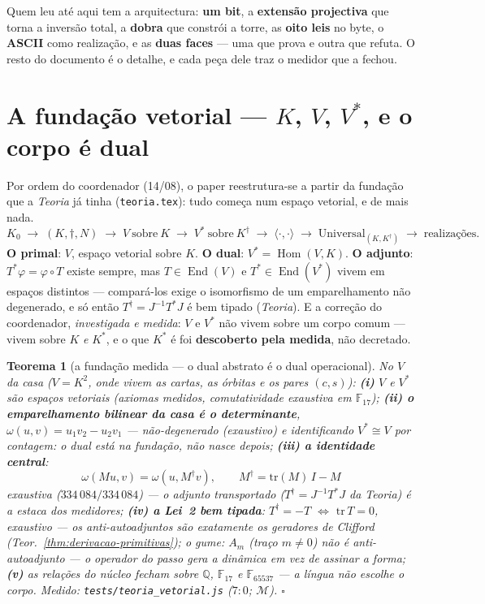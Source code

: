 \documentclass[11pt,a4paper]{article}
\newtheorem{teorema}{Teorema}
\newcommand{\code}[1]{\texttt{\small #1}}
\begin{document}
\medskip
\noindent Quem leu até aqui tem a arquitectura: \textbf{um bit}, a
\textbf{extensão projectiva} que torna a inversão total, a \textbf{dobra}
que constrói a torre, as \textbf{oito leis} no byte, o \textbf{ASCII}
como realização, e as \textbf{duas faces} --- uma que prova e outra que
refuta. O resto do documento é o detalhe, e cada peça dele traz o
medidor que a fechou.

\section{A fundação vetorial --- $K$, $V$, $V^{*}$, e o corpo é
dual}\label{sec:fundacao}

Por ordem do coordenador (14/08), o paper reestrutura-se a partir da
fundação que a \emph{Teoria} já tinha (\code{teoria.tex}): tudo começa
num espaço vetorial, e de mais nada.
\[
\boxed{
K_{0}
\;\longrightarrow\;
(K,\dagger,N)
\;\longrightarrow\;
V\ \text{sobre}\ K
\;\longrightarrow\;
V^{*}\ \text{sobre}\ K^{\dagger}
\;\longrightarrow\;
\langle\cdot,\cdot\rangle
\;\longrightarrow\;
\mathrm{Universal}_{(K,K^{\dagger})}
\;\longrightarrow\;
\text{realizações}.
}
\]
\textbf{O primal}: $V$, espaço vetorial sobre $K$. \textbf{O dual}:
$V^{*}=\operatorname{Hom}(V,K)$. \textbf{O adjunto}:
$T^{*}\varphi=\varphi\circ T$ existe sempre, mas
$T\in\operatorname{End}(V)$ e $T^{*}\in\operatorname{End}(V^{*})$
vivem em espaços distintos --- compará-los exige o isomorfismo de um
emparelhamento não degenerado, e só então
$T^{\dagger}=J^{-1}T^{*}J$ é bem tipado (\emph{Teoria}). E a correção
do coordenador, \emph{investigada e medida}: $V$ e $V^{*}$ não vivem
sobre um corpo comum --- vivem sobre $K$ \emph{e} $K^{*}$, e o que
$K^{*}$ é foi \textbf{descoberto pela medida}, não decretado.

\begin{teorema}[a fundação medida --- o dual abstrato é o dual
operacional]\label{thm:fundacao}
No $V$ da casa ($V=K^{2}$, onde vivem as cartas, as órbitas e os
pares $(c,s)$): \textbf{(i)} $V$ e $V^{*}$ são espaços vetoriais
(axiomas medidos, comutatividade exaustiva em $\mathbb{F}_{17}$);
\textbf{(ii) o emparelhamento bilinear da casa é o determinante},
$\omega(u,v)=u_{1}v_{2}-u_{2}v_{1}$ --- não-degenerado (exaustivo) e
identificando $V^{*}\cong V$ por contagem: \emph{o dual está na
fundação, não nasce depois}; \textbf{(iii) a identidade central}:
\[
\boxed{\;\omega(Mu,v)=\omega(u,M^{\dagger}v),\qquad
M^{\dagger}=\mathrm{tr}(M)\,I-M\;}
\]
exaustiva ($334\,084/334\,084$) --- o adjunto transportado
($T^{\dagger}=J^{-1}T^{*}J$ da \emph{Teoria}) \emph{é} a estaca dos
medidores; \textbf{(iv) a Lei~2 bem tipada}: $T^{\dagger}=-T$
$\iff$ $\mathrm{tr}\,T=0$, exaustivo --- os anti-autoadjuntos são
\emph{exatamente} os geradores de Clifford
(Teor.~\ref{thm:derivacao-primitivas}); o gume: $A_{m}$ (traço
$m\neq0$) não é anti-autoadjunto --- o operador do passo \emph{gera} a dinâmica
em vez de assinar a forma; \textbf{(v)} as relações do núcleo fecham
sobre $\mathbb{Q}$, $\mathbb{F}_{17}$ e $\mathbb{F}_{65537}$ --- a
língua não escolhe o corpo.
\emph{Medido:} \code{tests/teoria\_vetorial.js} ($7{:}0$;
$\mathcal{M}$).
$\square$
\end{teorema}
\end{document}
